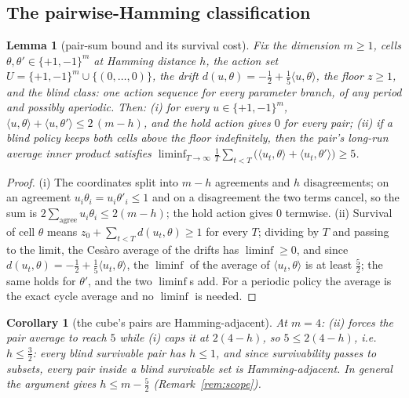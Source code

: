 \documentclass[10pt,twocolumn]{article}
\theoremstyle{plain}
\newtheorem{lemma}[theorem]{Lemma}
\newtheorem{corollary}[theorem]{Corollary}
\theoremstyle{definition}
\theoremstyle{remark}
\begin{document}
\subsection{The pairwise-Hamming classification}\label{hamming}

\begin{lemma}[pair-sum bound and its survival cost]\label{lem:pairsum}
Fix the dimension \(m \ge 1\), cells \(\theta, \theta' \in
\{+1,-1\}^{m}\) at Hamming distance \(h\), the action set
\(U = \{+1,-1\}^{m} \cup \{(0,\dots,0)\}\), the drift
\(d(u, \theta) = -\tfrac12 + \tfrac15\langle u, \theta\rangle\),
the floor \(z \ge 1\), and the blind class: one action sequence for
every parameter branch, of any period and possibly aperiodic. Then:
(i) for every \(u \in \{+1,-1\}^{m}\),
\(\langle u, \theta\rangle + \langle u, \theta'\rangle
\le 2\,(m - h)\), and the hold action gives \(0\) for every pair;
(ii) if a blind policy keeps both cells above the floor indefinitely,
then the pair's long-run average inner product satisfies
\(\liminf_{T \to \infty} \frac1T \sum_{t < T}
\bigl(\langle u_{t}, \theta\rangle + \langle u_{t},
\theta'\rangle\bigr) \ge 5\).
\end{lemma}

\begin{proof}
(i) The coordinates split into \(m - h\) agreements and \(h\)
disagreements; on an agreement \(u_{i}\theta_{i} = u_{i}\theta'_{i}
\le 1\) and on a disagreement the two terms cancel, so the sum is
\(2 \sum_{\text{agree}} u_{i}\theta_{i} \le 2(m-h)\); the hold
action gives \(0\) termwise. (ii) Survival of cell \(\theta\) means
\(z_{0} + \sum_{t < T} d(u_{t}, \theta) \ge 1\) for every \(T\);
dividing by \(T\) and passing to the limit, the Ces\`aro average of
the drifts has \(\liminf \ge 0\), and since
\(d(u_{t}, \theta) = -\tfrac12 + \tfrac15\langle u_{t},
\theta\rangle\), the \(\liminf\) of the average of
\(\langle u_{t}, \theta\rangle\) is at least
\(\tfrac52\); the same holds for \(\theta'\), and the two
\(\liminf\)s add. For a periodic policy the average is the exact
cycle average and no \(\liminf\) is needed.
\end{proof}

\begin{corollary}[the cube's pairs are Hamming-adjacent]
\label{cor:hamming}
At \(m = 4\): (ii) forces the pair average to reach \(5\) while (i)
caps it at \(2(4 - h)\), so \(5 \le 2(4 - h)\), i.e.\
\(h \le \tfrac32\): every blind survivable pair has \(h \le 1\),
and since survivability passes to subsets, every pair inside a blind
survivable set is Hamming-adjacent. In general the argument gives
\(h \le m - \tfrac52\) (Remark~\ref{rem:scope}).
\end{corollary}
\end{document}
